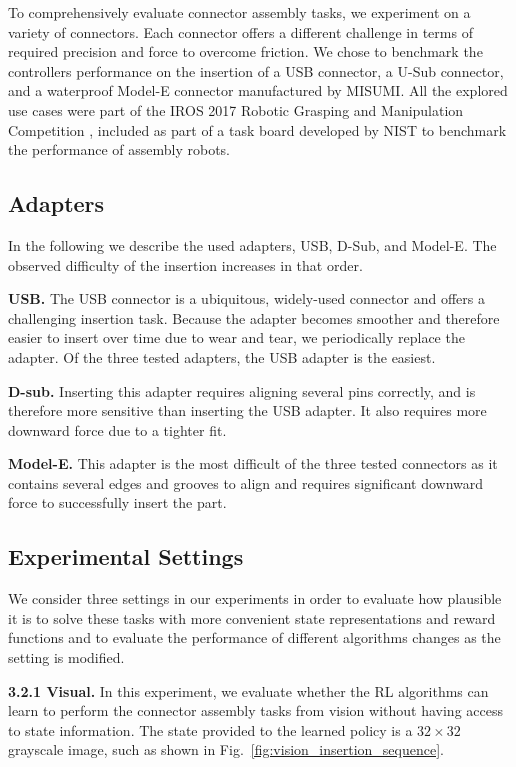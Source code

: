 To comprehensively evaluate connector assembly tasks, we experiment on a variety of connectors. Each connector offers a different challenge in terms of required precision and force to overcome friction. 
We chose to benchmark the controllers performance on the insertion of a USB connector, a U-Sub connector, and a waterproof Model-E connector manufactured by MISUMI.
All the explored use cases were part of the IROS 2017 Robotic Grasping and Manipulation Competition \citep{roboticgrasping2017iros}, included as part of a task board developed by NIST to benchmark the performance of assembly robots.

\subsection{Adapters}
In the following we describe the used adapters, USB, D-Sub, and Model-E. The observed difficulty of the insertion increases in that order.

\textbf{USB.} The USB connector is a ubiquitous, widely-used connector and offers a challenging insertion task. Because the adapter becomes smoother and therefore easier to insert over time due to wear and tear, we periodically replace the adapter. Of the three tested adapters, the USB adapter is the easiest.

\textbf{D-sub.} Inserting this adapter requires aligning several pins correctly, and is therefore more sensitive than inserting the USB adapter. It also requires more downward force due to a tighter fit.

\textbf{Model-E.} This adapter is the most difficult of the three tested connectors as it contains several edges and grooves to align and requires significant downward force to successfully insert the part.

\subsection{Experimental Settings}
We consider three settings in our experiments in order to evaluate how plausible it is to solve these tasks with more convenient state representations and reward functions and to evaluate the performance of different algorithms changes as the setting is modified.

\textbf{3.2.1 Visual. } In this experiment, we evaluate whether the RL algorithms can learn to perform the connector assembly tasks from vision without having access to state information. The state provided to the learned policy is a $32 \times 32$ grayscale image, such as shown in Fig.~\ref{fig:vision_insertion_sequence}.

